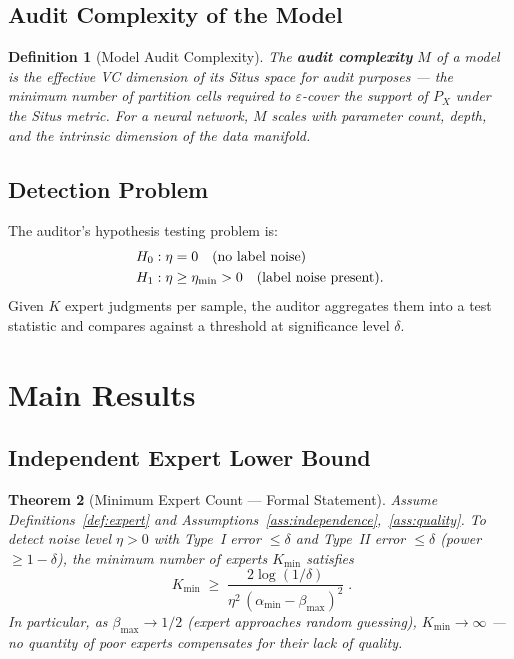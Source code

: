 \documentclass[12pt,a4paper]{article}
\newtheorem{theorem}{Theorem}[section]
\newtheorem{definition}[theorem]{Definition}
\newcommand{\etamin}{\eta_{\min}}
\begin{document}
\subsection{Audit Complexity of the Model}

\begin{definition}[Model Audit Complexity]
\label{def:model-complexity}
The \textbf{audit complexity} $M$ of a model is the effective VC dimension of
its Situs space for audit purposes --- the minimum number of partition cells
required to $\varepsilon$-cover the support of $P_X$ under the Situs metric.
For a neural network, $M$ scales with parameter count, depth, and the
intrinsic dimension of the data manifold.
\end{definition}

\subsection{Detection Problem}

The auditor's hypothesis testing problem is:
\begin{align}
    H_0&: \eta = 0 \quad\text{(no label noise)}\notag\\
    H_1&: \eta \geq \etamin > 0 \quad\text{(label noise present)}.
    \label{eq:hypotheses}
\end{align}
Given $K$ expert judgments per sample, the auditor aggregates them into a test
statistic and compares against a threshold at significance level $\delta$.

\section{Main Results}

\subsection{Independent Expert Lower Bound}

\begin{theorem}[Minimum Expert Count --- Formal Statement]
\label{thm:expert-lower}
Assume Definitions~\ref{def:expert}
and Assumptions~\ref{ass:independence},~\ref{ass:quality}.  To detect noise
level $\eta>0$ with Type~I error $\leq\delta$ and Type~II error $\leq\delta$
(power $\geq 1-\delta$), the minimum number of experts $K_{\min}$ satisfies
\begin{equation}\label{eq:K-min}
    \boxed{\;
    K_{\min} \;\geq\;
    \frac{2\log(1/\delta)}
         {\eta^{2}\,(\alpha_{\min}-\beta_{\max})^{2}}
    \;}.
\end{equation}
In particular, as $\beta_{\max}\to 1/2$ (expert approaches random guessing),
$K_{\min}\to\infty$ --- no quantity of poor experts compensates for their lack
of quality.
\end{theorem}
\end{document}
